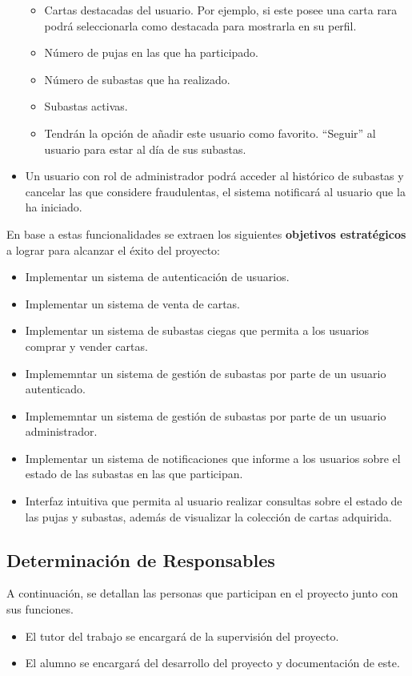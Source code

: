 \begin{itemize}
    \begin{itemize}
        \item Cartas destacadas del usuario. Por ejemplo, si este posee una carta rara podrá seleccionarla como destacada para mostrarla en su perfil.
        \item Número de pujas en las que ha participado.
        \item Número de subastas que ha realizado.
        \item Subastas activas.
        \item Tendrán la opción de añadir este usuario como favorito. ``Seguir'' al usuario para estar al día de sus subastas.
    \end{itemize}
    \item Un usuario con rol de administrador podrá acceder al histórico de subastas y cancelar las que considere fraudulentas, el sistema notificará al usuario que la ha iniciado.
\end{itemize}

En base a estas funcionalidades se extraen los siguientes \textbf{objetivos estratégicos} a lograr para alcanzar el éxito del proyecto:

\begin{itemize}
    \item Implementar un sistema de autenticación de usuarios.
    \item Implementar un sistema de venta de cartas.
    \item Implementar un sistema de subastas ciegas que permita a los usuarios comprar y vender cartas.
    \item Implememntar un sistema de gestión de subastas por parte de un usuario autenticado.
    \item Implememntar un sistema de gestión de subastas por parte de un usuario administrador.
    \item Implementar un sistema de notificaciones que informe a los usuarios sobre el estado de las subastas en las que participan.
    \item Interfaz intuitiva que permita al usuario realizar consultas sobre el estado de las pujas y subastas, además de visualizar la colección de cartas adquirida.
\end{itemize}

\subsection{Determinación de Responsables}
A continuación, se detallan las personas que participan en el proyecto junto con sus funciones.
\begin{itemize}
    \item El tutor del trabajo se encargará de la supervisión del proyecto.
    \item El alumno se encargará del desarrollo del proyecto y documentación de este. 
\end{itemize}

